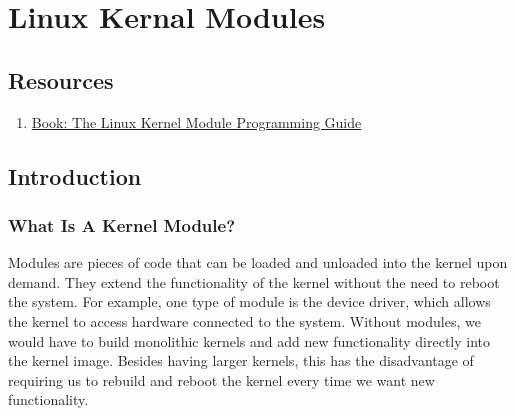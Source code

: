\chapter{Linux Kernal Modules}

\section{Resources}

\begin{enumerate}
  \item \href{https://sysprog21.github.io/lkmpg/}{Book: The Linux Kernel Module Programming Guide}
\end{enumerate}



\section{Introduction}

\subsection{What Is A Kernel Module?}
Modules are pieces of code that can be loaded and unloaded into the kernel upon demand. They extend the functionality of the kernel without the need to reboot the system. For example, one type of module is the device driver, which allows the kernel to access hardware connected to the system. Without modules, we would have to build monolithic kernels and add new functionality directly into the kernel image. Besides having larger kernels, this has the disadvantage of requiring us to rebuild and reboot the kernel every time we want new functionality. 
